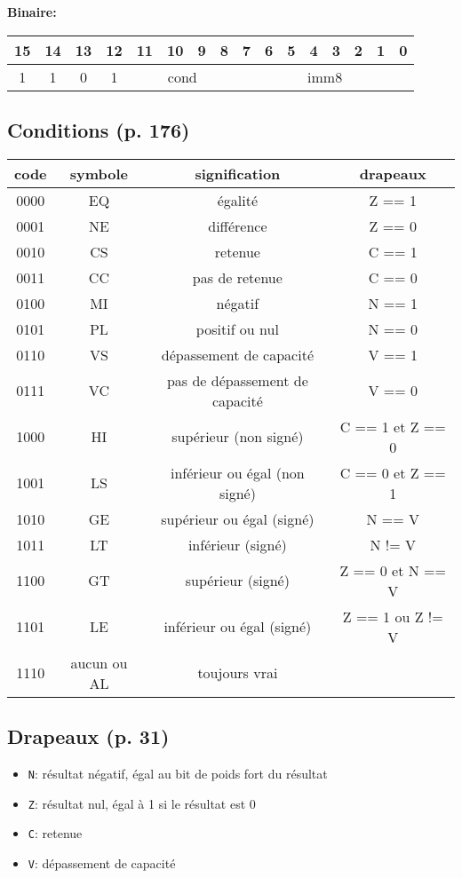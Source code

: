 \textbf{Binaire:}\\

\begin{tabular}{| c c c c c c c c c c c c c c c c |}
\hline
15 & 14 & 13 & 12 & \multicolumn{1}{|c}{11} & 10 & 9 & 8 & \multicolumn{1}{|c}{7} & 6 & 5 & 4 & 3 & 2 & 1 & 0 \\
\hline
1 & 1 & 0 & 1 & \multicolumn{4}{|c}{cond} & \multicolumn{8}{|c|}{imm8} \\
\hline
\end{tabular}








\subsection{Conditions (p. 176)}

\begin{tabular}{| c | c | c | c |}
\hline
\textbf{code} & \textbf{symbole} & \textbf{signification} & \textbf{drapeaux}\\
\hline
0000 & EQ & égalité & Z == 1\\
\hline
0001 & NE & différence & Z == 0\\
\hline
0010 & CS & retenue & C == 1\\
\hline
0011 & CC & pas de retenue & C == 0\\
\hline
0100 & MI & négatif & N == 1\\
\hline
0101 & PL & positif ou nul & N == 0\\
\hline
0110 & VS & dépassement de capacité & V == 1\\
\hline
0111 & VC & pas de dépassement de capacité & V == 0\\
\hline
1000 & HI & supérieur (non signé) & C == 1 et Z == 0\\
\hline
1001 & LS & inférieur ou égal (non signé) & C == 0 et Z == 1\\
\hline
1010 & GE & supérieur ou égal (signé) & N == V\\
\hline
1011 & LT & inférieur (signé) & N != V\\
\hline
1100 & GT & supérieur (signé) & Z == 0 et N == V\\
\hline
1101 & LE & inférieur ou égal (signé) & Z == 1 ou Z != V\\
\hline
1110 & aucun ou AL & toujours vrai & \\
\hline
\end{tabular}


\subsection{Drapeaux (p. 31)}
\label{subsec:Flags}

\begin{itemize}
	\item \texttt{N}: résultat négatif, égal au bit de poids fort du résultat
	\item \texttt{Z}: résultat nul, égal à 1 si le résultat est 0
	\item \texttt{C}: retenue
	\item \texttt{V}: dépassement de capacité
\end{itemize}


